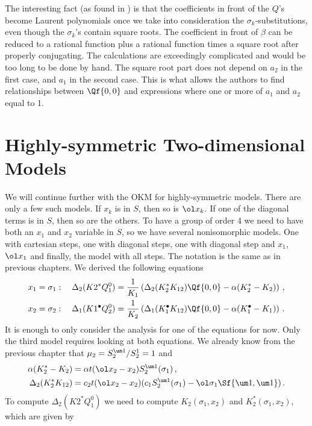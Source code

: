 The interesting fact (as found in \cite{tabbara2014exact}) is that the coefficients in front of the $Q$'s become Laurent polynomials once we take into consideration the $\sigma_k$-substitutions, even though the $\sigma_k$'s contain square roots. The coefficient in front of $\beta$ can be reduced to a rational function plus a rational function times a square root after properly conjugating. The calculations are exceedingly complicated and would be too long to be done by hand. The square root part does not depend on $a_2$ in the first case, and $a_1$ in the second case. This is what allows the authors to find relationships between $\Qf{0,0}$ and expressions where one or more of $a_1$ and $a_2$ equal to 1.

\section{Highly-symmetric Two-dimensional Models}
We will continue further with the OKM for highly-symmetric models. There are only a few such models. If $x_k$ is in $S$, then so is $\ol x_k$. If one of the diagonal terms is in $S$, then so are the others. To have a group of order 4 we need to have both an $x_1$ and $x_2$ variable in $S$, so we have several nonisomorphic models. One with cartesian steps, one with diagonal steps, one with diagonal step and $x_1$,$\ol x_1$ and finally, the model with all steps. The notation is the same as in previous chapters. We derived the following equations
\begin{align}
	x_1 = \sigma_1:\quad\Delta_2(K2^\ast Q_1^0) &=\frac{1}{K_1} \left(\Delta_2(K_2^\ast K_{12})\Qf{0,0} - \alpha(K_2^\ast-K_2)\right)\,,\\
	x_2 = \sigma_2:\quad\Delta_1(K1^\bullet Q_2^0) &=\frac{1}{K_2} \left(\Delta_1(K_1^\bullet K_{12})\Qf{0,0} - \alpha(K_1^\bullet-K_1)\right)\,.
\end{align}
It is enough to only consider the analysis for one of the equations for now. Only the third model requires looking at both equations. We already know from the previous chapter that $\mu_2 = S_2^{\um 1}/S_2^1 = 1$ and 
\begin{align}
	\alpha(K_2^\ast -K_2)  &= \alpha t(\ol x_2 - x_2)S_2^{\um 1}(\sigma_1)\,,\\
	\Delta_2(K_2^\ast K_{12}) &= c_2t(\ol x_2-x_2)(c_1S_2^{\um 1}(\sigma_1) - \ol \sigma_1\Sf{\um 1,\um 1})\,.
\end{align}
To compute $\Delta_2(K2^\ast Q_1^0)$ we need to compute $K_2(\sigma_1,x_2)$ and $K_2^\ast(\sigma_1,x_2)$, which are given by

